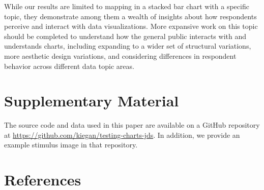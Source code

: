 \documentclass[
]{jds}
\begin{document}
While our results are limited to mapping in a stacked bar chart with a
specific topic, they demonstrate among them a wealth of insights about
how respondents perceive and interact with data visualizations. More
expansive work on this topic should be completed to understand how the
general public interacts with and understands charts, including
expanding to a wider set of structural variations, more aesthetic design
variations, and considering differences in respondent behavior across
different data topic areas.

\hypertarget{supplementary-material}{%
\section{Supplementary Material}\label{supplementary-material}}

The source code and data used in this paper are available on a GitHub
repository at \url{https://github.com/kiegan/testing-charts-jds}. In
addition, we provide an example stimulus image in that repository.

\hypertarget{references}{%
\section*{References}\label{references}}
\end{document}
